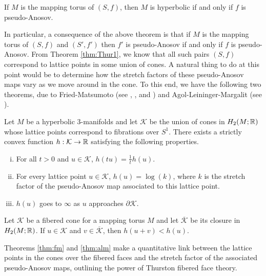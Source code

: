 \begin{thm}
    \label{thm:ThurHyp}
  If $M$ is the mapping torus of $(S, f)$, then $M$ is hyperbolic if and only if $f$ is pseudo-Anosov.
\end{thm}

In particular, a consequence of the above theorem is that if $M$ is the mapping torus of $(S, f)$
and $(S', f')$ then $f'$ is pseudo-Anosov if and only if $f$ is pseudo-Anosov. From Theorem
\ref{thm:Thur1}, we know that all such pairs $(S, f)$ correspond to lattice points in some union of
cones. A natural thing to do at this point would be to determine how the stretch factors of these
pseudo-Anosov maps vary as we move around in the cone. To this end, we have the following two
theorems, due to Fried-Matsumoto (see \cite{fried1982flow}, \cite{fried1983transitive}, and
\cite{matsumoto1987topological}) and Agol-Leininger-Margalit (see \cite{agol6983pseudo}).

\begin{thm}
  \label{thm:fm}
  Let $M$ be a hyperbolic $3$-manifolds and let $\mathcal{K}$ be the union of cones in $H_2(M; \mathbb{R})$
  whose lattice points correspond to fibrations over $S^1$.  There exists a strictly convex function
  $h: \mathcal{K} \to \mathbb{R}$ satisfying the following properties.
  \begin{enumerate}[(i)]
  \item For all $t > 0$ and $u \in \mathcal{K}$, $h(tu) =  \frac{1}{t}h(u)$.
  \item For every lattice point $u \in \mathcal{K}$, $h(u) = \log(k)$, where $k$ is the stretch factor
    of the pseudo-Anosov map associated to this lattice point.
  \item $h(u)$ goes to $\infty$ as $u$ approaches $\partial \mathcal{K}$.
  \end{enumerate}
\end{thm}

\begin{thm}
  \label{thm:alm}
  Let $\mathcal{K}$ be a fibered cone for a mapping torus $M$ and let $\overline{\mathcal{K}}$ be its closure
  in $H_2(M;\mathbb{R})$. If $u \in \mathcal{K}$ and $v \in \overline{\mathcal{K}}$, then $h(u+v) < h(u)$.
\end{thm}
Theorems \ref{thm:fm} and \ref{thm:alm} make a quantitative link between the lattice points in the cones
over the fibered faces and the stretch factor of the associated pseudo-Anosov maps, outlining the power
of Thurston fibered face theory.

